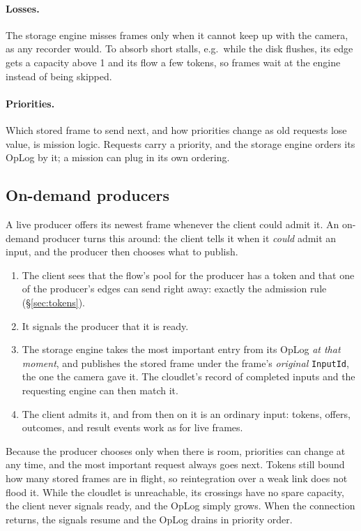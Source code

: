 \documentclass[11pt]{article}
\newcommand{\code}[1]{\texttt{#1}}
\begin{document}
\paragraph{Losses.} The storage engine misses frames only when it cannot keep
up with the camera, as any recorder would. To absorb short stalls, e.g.\
while the disk flushes, its edge gets a capacity above 1 and its flow a few
tokens, so frames wait at the engine instead of being skipped.

\paragraph{Priorities.} Which stored frame to send next, and how priorities
change as old requests lose value, is mission logic. Requests carry a
priority, and the storage engine orders its OpLog by it; a mission can plug in
its own ordering.

\subsection{On-demand producers}

A live producer offers its newest frame whenever the client could admit it. An
on-demand producer turns this around: the client tells it when it \emph{could}
admit an input, and the producer then chooses what to publish.
\begin{enumerate}[nosep]
  \item The client sees that the flow's pool for the producer has a token and
        that one of the producer's edges can send right away: exactly the
        admission rule (\S\ref{sec:tokens}).
  \item It signals the producer that it is ready.
  \item The storage engine takes the most important entry from its OpLog
        \emph{at that moment}, and publishes the stored frame under the frame's
        \emph{original} \code{InputId}, the one the camera gave it. The
        cloudlet's record of completed inputs and the requesting engine can
        then match it.
  \item The client admits it, and from then on it is an ordinary input:
        tokens, offers, outcomes, and result events work as for live frames.
\end{enumerate}
Because the producer chooses only when there is room, priorities can change at
any time, and the most important request always goes next. Tokens still bound
how many stored frames are in flight, so reintegration over a weak link does
not flood it. While the cloudlet is unreachable, its crossings have no spare
capacity, the client never signals ready, and the OpLog simply grows. When the
connection returns, the signals resume and the OpLog drains in priority order.
\end{document}
